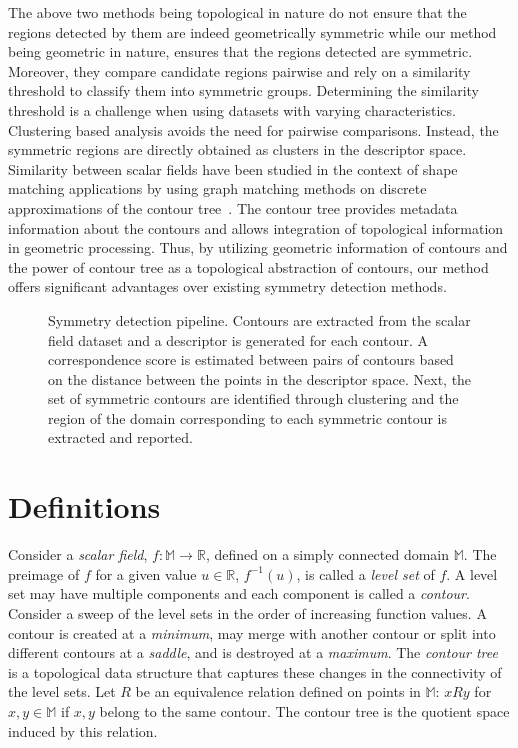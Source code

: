 \documentclass[review,journal]{vgtc}         %
\begin{document}
The above two methods being topological in nature do not ensure that the regions detected by
them are indeed geometrically symmetric while our method being geometric in nature, 
ensures that the regions detected are symmetric. Moreover, they compare candidate regions 
pairwise and rely on a similarity threshold to classify them into symmetric groups. Determining
the similarity threshold is a challenge when using datasets with varying characteristics.
Clustering based analysis avoids the need for pairwise comparisons. Instead, the symmetric regions
are directly obtained as clusters in the descriptor space. 
Similarity between scalar fields have been
studied in the context of shape matching applications by using graph matching methods on 
discrete approximations of the contour tree~\cite{ZhangBKDNB06,HilagaSKK01}.
The contour tree provides metadata information about the contours
and allows integration of topological information in geometric processing. Thus, by utilizing 
geometric information of contours and the power of contour tree as a topological abstraction of 
contours, our method offers significant advantages over existing symmetry detection methods. 
\begin{figure*}[t]
	\centering
	\caption{\label{pipeline} Symmetry detection pipeline. Contours are extracted
		from the scalar field dataset and a descriptor is generated for each contour.
		A correspondence score is estimated between pairs of contours based on the
		distance between the points in the descriptor space. Next, the set of symmetric
		contours are identified through clustering and the region of the domain corresponding
	to each symmetric contour is extracted and reported.}
\end{figure*}
\section{Definitions}
Consider a \emph{scalar field}, $f : \mathbb{M}  \rightarrow \mathbb{R}$, defined on a 
simply connected domain $\mathbb{M}$. The preimage of $f$ for a given value $u \in \mathbb{R}$, 
$f^{-1}(u)$, is called a \emph{level set} of $f$. A level set may have multiple components
and each component is called a \emph{contour}. Consider a sweep of the level sets in the order
of increasing function values. A contour is created at a \emph{minimum}, may merge
with another contour or split into different contours at a \emph{saddle}, and is destroyed
at a \emph{maximum}. The \emph{contour tree} is a topological 
data structure that captures these changes in the connectivity of the level sets. 
Let $R$ be an equivalence relation defined on points in $\mathbb{M}$: $xRy$ for $x,y 
\in \mathbb{M}$  if $x,y$ belong to the same contour. The contour tree is the quotient space 
induced by this relation. 
\end{document}
